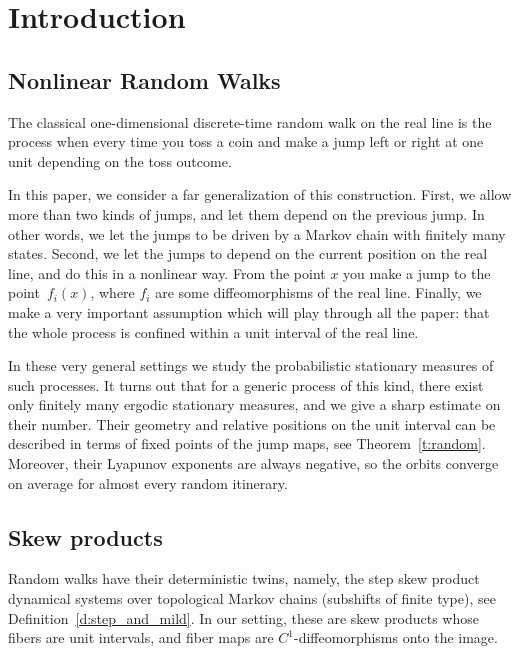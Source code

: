 \documentclass[a4paper,12pt]{amsart}
\begin{document}
\maketitle

\section{Introduction}  \label{sec:intro}


\subsection{Nonlinear Random Walks}

The classical one-dimensional discrete-time random walk on the real line is the process when every time you toss a coin and make a jump left or right at one unit depending on the toss outcome.

In this paper, we consider a far generalization of this construction. First, we allow more than two kinds of jumps, and let them depend on the previous jump. In other words, we let the jumps to be driven by a Markov chain with finitely many states. Second, we let the jumps to depend on the current position on the real line, and do this in a nonlinear way. From the point $x$ you make a jump to the point~$f_i(x)$, where $f_i$ are some
diffeomorphisms of the real line. Finally, we make a very important assumption which will play through all the paper: that the whole process is confined within a unit interval of the real line.

In these very general settings we study the probabilistic stationary measures of such processes. It turns out that for a generic process of this kind, there exist only finitely many ergodic stationary measures, and we give a sharp estimate on their number. Their geometry and relative positions on the unit interval can be described in terms of fixed points of the jump maps, see Theorem~\ref{t:random}. Moreover, their Lyapunov exponents are always negative, so the orbits converge on average for almost every random itinerary.



\subsection{Skew products}

Random walks have their deterministic twins, namely, the step skew product dynamical systems over topological Markov chains (subshifts of finite type), see Definition~\ref{d:step_and_mild}.
In our setting, these are skew products whose fibers are unit intervals, and fiber maps are $C^1$-diffeomorphisms onto the image. 
\end{document}
